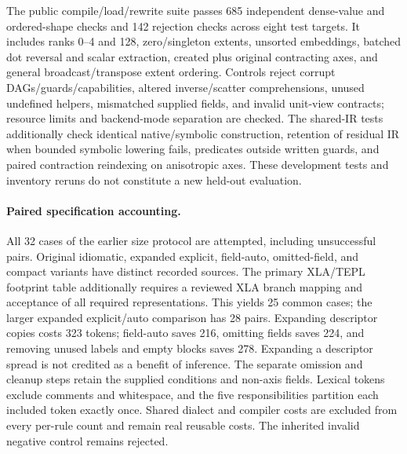 The public compile/load/rewrite suite passes 685 independent dense-value
and ordered-shape checks and 142 rejection checks across eight test targets.
It includes ranks 0--4 and 128, zero/singleton extents, unsorted embeddings,
batched dot reversal and scalar extraction, created plus original contracting
axes, and general broadcast/transpose extent ordering. Controls reject
corrupt DAGs/guards/capabilities, altered inverse/scatter comprehensions,
unused undefined helpers, mismatched supplied fields, and invalid unit-view
contracts; resource limits and backend-mode separation are checked.
The shared-IR tests additionally check identical native/symbolic construction,
retention of residual IR when bounded symbolic lowering fails, predicates
outside written guards, and paired contraction reindexing on anisotropic axes.
These development tests and inventory reruns do not constitute a new
held-out evaluation.

\paragraph{Paired specification accounting.}
All 32 cases of the earlier size protocol are attempted, including
unsuccessful pairs. Original idiomatic, expanded explicit, field-auto,
omitted-field, and compact variants have distinct recorded sources.
The primary XLA/TEPL footprint table additionally requires a reviewed
XLA branch mapping and acceptance of all required representations.
This yields 25 common cases; the larger expanded explicit/auto comparison
has 28 pairs. Expanding descriptor copies costs 323 tokens; field-auto saves 216,
omitting fields saves 224, and removing unused labels and empty blocks
saves 278. Expanding a descriptor spread is not credited as a benefit
of inference. The separate omission and cleanup steps retain the supplied
conditions and non-axis fields. Lexical tokens exclude comments and
whitespace, and the five responsibilities partition each included token
exactly once. Shared dialect and compiler costs are excluded from every
per-rule count and remain real reusable costs. The inherited invalid
negative control remains rejected.
